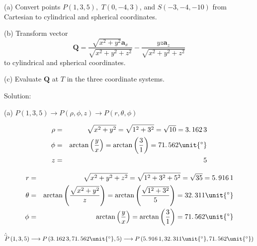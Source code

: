 \documentclass{article}
\begin{document}
(a) Convert points $P\left( 1,3,5\right) ,$ $T\left( 0,-4,3\right) $, and $%
S\left( -3,-4,-10\right) $ from Cartesian to cylindrical and spherical
coordinates.

(b) Transform vector 
\[
\mathbf{Q=}\dfrac{\sqrt{x^{2}+y^{2}}\mathbf{a}_{x}}{\sqrt{x^{2}+y^{2}+z^{2}}}%
-\dfrac{yz\mathbf{a}_{z}}{\sqrt{x^{2}+y^{2}+z^{2}}} 
\]%
to cylindrical and spherical coordinates.

(c) Evaluate $\mathbf{Q}$ at $T$ in the three coordinate systems.

Solution:

(a) $P\left( 1,3,5\right) \longrightarrow P\left( \rho ,\phi ,z\right)
\longrightarrow P\left( r,\theta ,\phi \right) $

\begin{eqnarray*}
\rho &=&\sqrt{x^{2}+y^{2}}=\sqrt{1^{2}+3^{2}}=\sqrt{10}=3.\,\allowbreak
162\,3 \\
\phi &=&\arctan \left( \dfrac{y}{x}\right) =\arctan \left( \dfrac{3}{1}%
\right) =71.\,\allowbreak 562\unit{%
{{}^\circ}%
} \\
z &=&5
\end{eqnarray*}

\begin{eqnarray*}
r &=&\sqrt{x^{2}+y^{2}+z^{2}}=\sqrt{1^{2}+3^{2}+5^{2}}=\sqrt{35}=\allowbreak
5.\,\allowbreak 916\,1 \\
\theta &=&\arctan \left( \dfrac{\sqrt{x^{2}+y^{2}}}{z}\right) =\arctan
\left( \dfrac{\sqrt{1^{2}+3^{2}}}{5}\right) =32.\,\allowbreak 311\unit{%
{{}^\circ}%
} \\
\phi &=&\arctan \left( \dfrac{y}{x}\right) =\arctan \left( \dfrac{3}{1}%
\right) =71.\,\allowbreak 562\unit{%
{{}^\circ}%
}
\end{eqnarray*}

$\therefore $ $P\left( 1,3,5\right) \longrightarrow P\left( 3.\,\allowbreak
162\,3,71.\,\allowbreak 562\unit{%
{{}^\circ}%
},5\right) \longrightarrow P\left( 5.\,\allowbreak 916\,1,32.\,\allowbreak
311\unit{%
{{}^\circ}%
},71.\,\allowbreak 562\unit{%
{{}^\circ}%
}\right) $
\end{document}
